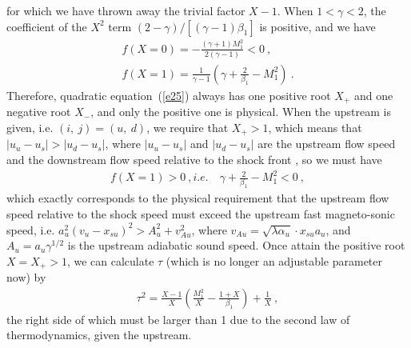 \documentclass[fleqn,usenatbib]{mnras}
\begin{document}
for which we have thrown away the trivial factor $X-1$. When $1<\gamma<2$, the coefficient of the $X^{2}$ term  $(2-\gamma)/\left[(\gamma-1)\beta_{1}\right]$ is positive, and we have
\begin{gather}
f(X=0)=-\frac{(\gamma+1)M_{1}^{2}}{2(\gamma-1)}<0\ ,\label{e26}\\
f(X=1)=\frac{1}{\gamma-1}\left(\gamma+\frac{2}{\beta_{1}}-M_{1}^{2}\right)\ .\label{e27}
\end{gather}
Therefore, quadratic equation~(\ref{e25}) always has one positive root $X_{+}$ and one negative root $X_{-}$, and only the positive one is physical. When the upstream is given, i.e. $(i,\ j)=(u,\ d)$, we require that $X_{+}>1$, which means that $|u_{u}-u_{s}|>|u_{d}-u_{s}|$, where $|u_{u}-u_{s}|$ and $|u_{d}-u_{s}|$ are the upstream flow speed and the downstream flow speed relative to the shock front \citep{FM}, so we must have 
\begin{gather}
f(X=1)>0\ ,i.e.\quad \gamma+\frac{2}{\beta_{1}}-M_{1}^{2}<0\ ,\label{e28}
\end{gather}
which exactly corresponds to the physical requirement that the upstream flow speed relative to the shock speed must exceed the upstream fast magneto-sonic speed, i.e. $a_{u}^{2}\left(v_{u}-x_{su}\right)^{2}>A_{u}^{2}+v_{Au}^{2}$, where $v_{Au}=\sqrt{\lambda\alpha_{u}}\cdot x_{su}a_{u}$, and $A_{u}=a_{u}\gamma^{1/2}$ is the upstream adiabatic sound speed. Once attain the positive root $X=X_{+}>1$, we can calculate $\tau$ (which is no longer an adjustable parameter now) by
\begin{gather}
\tau^{2}=\frac{X-1}{X}\left(\frac{M_{1}^{2}}{X}-\frac{1+X}{\beta_{1}}\right)+\frac{1}{X}\ ,\label{e29}
\end{gather}
the right side of which must be larger than 1 due to the second law of thermodynamics, given the upstream.
\end{document}

